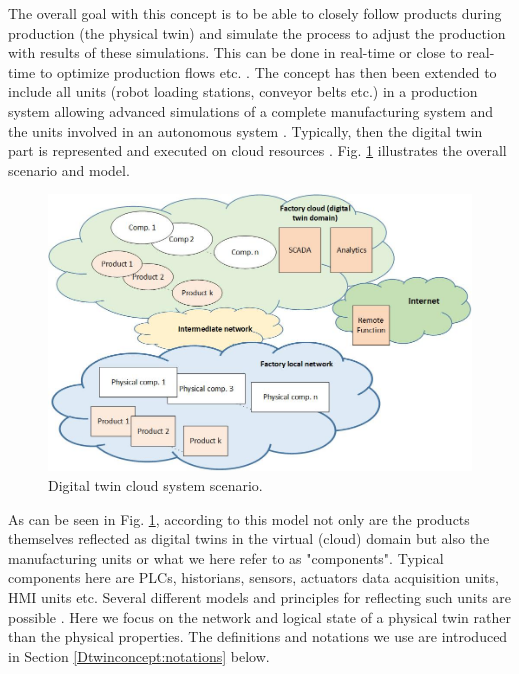 The overall goal with this concept is to be able to closely follow products during production (the physical twin) and simulate the process to adjust the production with results of these simulations. This can be done in real-time or close to real-time to optimize production flows etc. \cite{UHLEMANN2017}. The concept has then been extended to include all units (robot loading stations, conveyor belts etc.) in a production system allowing advanced simulations of a complete manufacturing system and the units involved in an autonomous system \cite{ROSEN2015}. Typically, then the digital twin part is represented and executed on cloud resources \cite{Shahriar2018}. Fig. \ref{figure:digital_twin_cloud} illustrates the overall scenario and model. 

\begin{figure}[ht]
   \centering
    \includegraphics[scale=0.34]{papers/digital-twin/images/FIG2_TII-19-1326}
    \caption{Digital twin cloud system scenario.}
    \label{figure:digital_twin_cloud}
\end{figure}

As can be seen in Fig. \ref{figure:digital_twin_cloud}, according to this model not only are the products themselves reflected as digital twins in the virtual (cloud) domain but also the manufacturing units or what we here refer to as "components". Typical components here are PLCs, historians, sensors, actuators data acquisition units, HMI units etc. Several different models and principles for reflecting such units are possible \cite{Eckhart2018_2}. Here we focus on the network and logical state of a physical twin rather than the physical properties. The definitions and notations we use are introduced in Section \ref{Dtwinconcept:notations} below.

